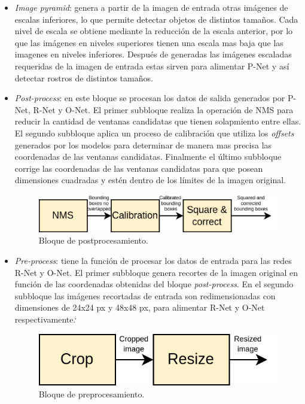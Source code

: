 \begin{itemize}
	\item \textit{Image pyramid}: genera a partir de la imagen de entrada otras imágenes de escalas inferiores, lo que permite detectar objetos de distintos tamaños. Cada nivel de escala se obtiene mediante la reducción de la escala anterior, por lo que las imágenes en niveles superiores tienen una escala mas baja que las imagenes en niveles inferiores. Después de generadas las imágenes escaladas requeridas de la imagen de entrada estas sirven para alimentar P-Net y así detectar rostros de distintos tamaños.

	\item \textit{Post-process}: en este bloque se procesan los datos de salida generados por P-Net, R-Net y O-Net. El primer subbloque realiza la operación de NMS para reducir la cantidad de ventanas candidatas que tienen solapmiento entre ellas. El segundo subbloque aplica un proceso de calibración que utiliza los \textit{offsets} generados por los modelos para determinar de manera mas precisa las coordenadas de las ventanas candidatas. Finalmente el último subbloque corrige las coordenadas de las ventanas candidatas para que posean dimensiones cuadradas y estén dentro de los límites de la imagen original.
	\begin{figure}[h]
		\centering
		\includegraphics[scale=0.35]{./Figures/mtcnn_postprocess.png}
		\caption{Bloque de postprocesamiento.}
		\label{fig:mtcnn_postprocess}
	\end{figure}
	
	\item \textit{Pre-process}: tiene la función de procesar los datos de entrada para las redes R-Net y O-Net. El primer subbloque genera recortes de la imagen original en función de las coordenadas obtenidas del bloque \textit{post-process}. En el segundo subbloque las imágenes recortadas de entrada son redimensionadas con dimensiones de 24x24 px y 48x48 px, para alimentar R-Net y O-Net respectivamente.`
	\begin{figure}[h]
		\centering
		\includegraphics[scale=0.35]{./Figures/mtcnn_preprocess.png}
		\caption{Bloque de preprocesamiento.}
		\label{fig:mtcnn_preprocess}
	\end{figure}

\end{itemize}

